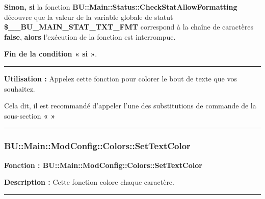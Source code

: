 \documentclass[a4paper,10pt]{article}
\begin{document}
\begin{justify}
    \textbf{\color{cond}Sinon, si} la fonction \textbf{\color{func}BU::Main::Status::CheckStatAllowFormatting} découvre que la valeur de la variable globale de statut \textbf{\color{vars}\$\_\_BU\_MAIN\_STAT\_TXT\_FMT} correspond à la chaîne de caractères \textbf{false}, \textbf{\color{cond}alors} l'exécution de la fonction est interrompue.
\end{justify}

\begin{justify}
    \textbf{\color{cond}Fin de la condition « si »}.
\end{justify}


\par\noindent\rule{\textwidth}{0.4pt}

\begin{justify}
    \textbf{Utilisation :} Appelez cette fonction pour colorer le bout de texte que vos souhaitez.
\end{justify}

\begin{justify}
    Cela dit, il est recommandé d'appeler l'une des substitutions de commande de la sous-section \textbf{\color{sec2}«  »}
\end{justify}






\color{sec3}\par\noindent\rule{\textwidth}{0.4pt}\color{text}

\color{sec3}
\subsubsection{BU::Main::ModConfig::Colors::SetTextColor}\color{text}

\begin{justify}
    \textbf{Fonction : \color{func}BU::Main::ModConfig::Colors::SetTextColor}
\end{justify}

\begin{justify}
    \textbf{Description :} Cette fonction colore chaque caractère.
\end{justify}


\par\noindent\rule{\textwidth}{0.4pt}
\end{document}

